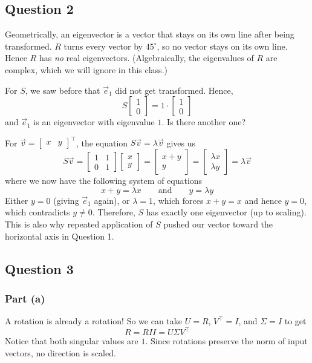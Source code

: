 \documentclass[11pt]{article}
\begin{document}
\subsection*{Question 2}
Geometrically, an eigenvector is a vector that stays on its own line after being transformed. $R$ turns every vector by $45^\circ$, so no vector stays on its own line. Hence $R$ has \emph{no} real eigenvectors. (Algebraically, the eigenvalues of $R$ are complex, which we will ignore in this class.)

For $S$, we saw before that $\vec{e}_1$ did not get transformed. Hence,
\[
S\begin{bmatrix}1\\0\end{bmatrix}=1\cdot\begin{bmatrix}1\\0\end{bmatrix}
\]
and $\vec{e}_1$ is an eigenvector with eigenvalue $1$. Is there another one? 

For $\vec{v}=\begin{bmatrix}x & y\end{bmatrix}^\top$, the equation $S\vec{v}=\lambda\vec{v}$ gives us
\[
S\vec{v} = \begin{bmatrix}
    1 & 1\\0 & 1
\end{bmatrix}\begin{bmatrix}x\\y\end{bmatrix} = \begin{bmatrix}x+y\\y\end{bmatrix} = \begin{bmatrix}\lambda x\\ \lambda y\end{bmatrix} = \lambda\vec{v}
\]
where we now have the following system of equations
\[
x+y=\lambda x\qquad \text{and}\qquad y=\lambda y
\]
Either $y=0$ (giving $\vec{e}_1$ again), or $\lambda=1$, which forces $x+y=x$ and hence $y=0$, which contradicts $y\neq 0$. Therefore, $S$ has exactly one eigenvector (up to scaling). This is also why repeated application of $S$ pushed our vector toward the horizontal axis in Question 1.

\subsection*{Question 3}

\subsubsection*{Part (a)}
A rotation is already a rotation! So we can take $U=R$, $V^\top=I$, and $\Sigma=I$ to get
\[
R = RII = U\Sigma V^\top
\]
Notice that both singular values are $1$. Since rotations preserve the norm of input vectors, no direction is scaled.
\end{document}
